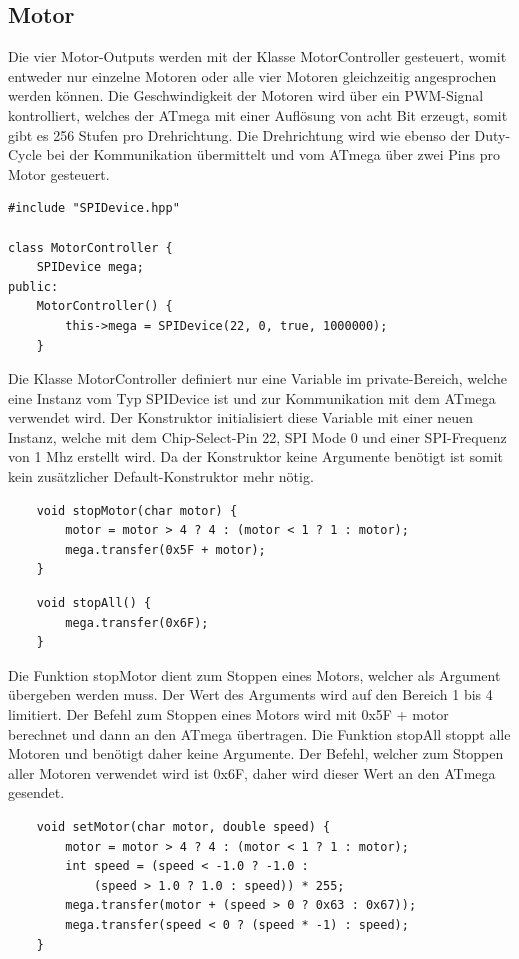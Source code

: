\documentclass[12pt]{article}
\begin{document}
\subsection{Motor}
Die vier Motor-Outputs werden mit der Klasse MotorController gesteuert, womit entweder nur einzelne Motoren oder alle vier Motoren gleichzeitig angesprochen werden können. Die Geschwindigkeit der Motoren wird über ein PWM-Signal kontrolliert, welches der ATmega mit einer Auflösung von acht Bit erzeugt, somit gibt es 256 Stufen pro Drehrichtung. Die Drehrichtung wird wie ebenso der Duty-Cycle bei der Kommunikation übermittelt und vom ATmega über zwei Pins pro Motor gesteuert.\\
\begin{verbatim}
#include "SPIDevice.hpp"

class MotorController {
    SPIDevice mega;
public:
    MotorController() {
        this->mega = SPIDevice(22, 0, true, 1000000);  
    }
\end{verbatim}
Die Klasse MotorController definiert nur eine Variable im private-Bereich, welche eine Instanz vom Typ SPIDevice ist und zur Kommunikation mit dem ATmega verwendet wird. Der Konstruktor initialisiert diese Variable mit einer neuen Instanz, welche mit dem Chip-Select-Pin 22, SPI Mode 0 und einer SPI-Frequenz von 1 Mhz erstellt wird. Da der Konstruktor keine Argumente benötigt ist somit kein zusätzlicher Default-Konstruktor mehr nötig.\\
\begin{verbatim}
    void stopMotor(char motor) {
        motor = motor > 4 ? 4 : (motor < 1 ? 1 : motor);  
        mega.transfer(0x5F + motor);
    }
\end{verbatim}
\begin{verbatim}
    void stopAll() {
        mega.transfer(0x6F); 
    }
\end{verbatim}
Die Funktion stopMotor dient zum Stoppen eines Motors, welcher als Argument übergeben werden muss. Der Wert des Arguments wird auf den Bereich 1 bis 4 limitiert. Der Befehl zum Stoppen eines Motors wird mit 0x5F + motor berechnet und dann an den ATmega übertragen.
Die Funktion stopAll stoppt alle Motoren und benötigt daher keine Argumente. Der Befehl, welcher zum Stoppen aller Motoren verwendet wird ist 0x6F, daher wird dieser Wert an den ATmega gesendet.\\
\begin{verbatim}
    void setMotor(char motor, double speed) {
        motor = motor > 4 ? 4 : (motor < 1 ? 1 : motor);  
        int speed = (speed < -1.0 ? -1.0 : 
            (speed > 1.0 ? 1.0 : speed)) * 255;
        mega.transfer(motor + (speed > 0 ? 0x63 : 0x67));
        mega.transfer(speed < 0 ? (speed * -1) : speed);
    }
\end{verbatim}
\end{document}
